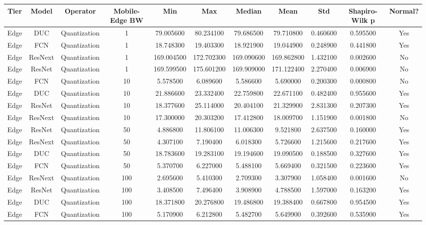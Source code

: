 \begin{tabular}{|c||c||c||c||c||c||c||c||c||c||c|}
\toprule
Tier & Model & Operator & Mobile-Edge BW & Min & Max & Median & Mean & Std & Shapiro-Wilk p & Normal? \\
\midrule
Edge & DUC & Quantization & 1 & 79.005600 & 80.234100 & 79.686500 & 79.710800 & 0.460600 & 0.595500 & Yes \\
Edge & FCN & Quantization & 1 & 18.748300 & 19.403300 & 18.921900 & 19.044900 & 0.248900 & 0.441800 & Yes \\
Edge & ResNext & Quantization & 1 & 169.004500 & 172.702300 & 169.090600 & 169.862800 & 1.432100 & 0.002600 & No \\
Edge & ResNet & Quantization & 1 & 169.599500 & 175.601200 & 169.909000 & 171.122400 & 2.270400 & 0.006900 & No \\
Edge & FCN & Quantization & 10 & 5.578500 & 6.089600 & 5.586600 & 5.690000 & 0.200300 & 0.000800 & No \\
Edge & DUC & Quantization & 10 & 21.886600 & 23.332400 & 22.759800 & 22.671100 & 0.482400 & 0.955600 & Yes \\
Edge & ResNet & Quantization & 10 & 18.377600 & 25.114000 & 20.404100 & 21.329900 & 2.831300 & 0.207300 & Yes \\
Edge & ResNext & Quantization & 10 & 17.300000 & 20.303200 & 17.412800 & 18.009700 & 1.151900 & 0.001800 & No \\
Edge & ResNet & Quantization & 50 & 4.886800 & 11.806100 & 11.006300 & 9.521800 & 2.637500 & 0.160000 & Yes \\
Edge & ResNext & Quantization & 50 & 4.307100 & 7.190400 & 6.018300 & 5.726600 & 1.215600 & 0.217600 & Yes \\
Edge & DUC & Quantization & 50 & 18.783600 & 19.283100 & 19.194600 & 19.090500 & 0.188500 & 0.327600 & Yes \\
Edge & FCN & Quantization & 50 & 5.370700 & 6.227000 & 5.488100 & 5.669400 & 0.321500 & 0.223600 & Yes \\
Edge & ResNext & Quantization & 100 & 2.695600 & 5.410300 & 2.709300 & 3.307900 & 1.058400 & 0.001600 & No \\
Edge & ResNet & Quantization & 100 & 3.408500 & 7.496400 & 3.908900 & 4.788500 & 1.597000 & 0.163200 & Yes \\
Edge & DUC & Quantization & 100 & 18.371800 & 20.276800 & 19.486800 & 19.388400 & 0.667800 & 0.954500 & Yes \\
Edge & FCN & Quantization & 100 & 5.170900 & 6.212800 & 5.482700 & 5.649900 & 0.392600 & 0.535900 & Yes \\

\end{tabular}
